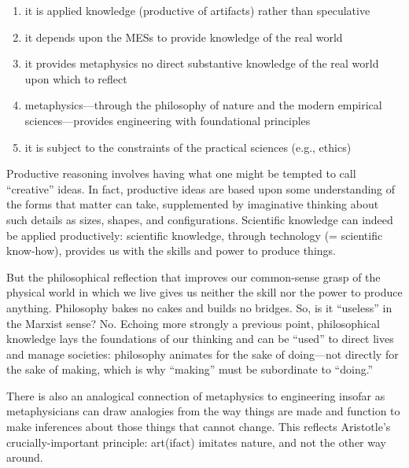 \begin{enumerate}
\item it is applied knowledge (productive of artifacts) rather than speculative
\item it depends upon the MESs to provide knowledge of the real world
\item it provides metaphysics no direct substantive knowledge of the real world upon which to reflect
\item metaphysics---through the philosophy of nature and the modern empirical sciences---provides engineering with foundational principles
\item it is subject to the constraints of the practical sciences (e.g., ethics)
\end{enumerate}

Productive reasoning involves having what one might be tempted to call ``creative'' ideas. In fact, productive ideas are based upon some understanding of the forms that matter can take, supplemented by imaginative thinking about such details as sizes, shapes, and configurations. Scientific knowledge can indeed be applied productively: scientific knowledge, through technology (= scientific know-how), provides us with the skills and power to produce things.

But the philosophical reflection that improves our common-sense grasp of the physical world in which we live gives us neither the skill nor the power to produce anything. Philosophy bakes no cakes and builds no bridges. So, is it ``useless'' in the Marxist sense? No. Echoing more strongly a previous point, philosophical knowledge lays the foundations of our thinking and can be ``used'' to direct lives and manage societies: philosophy animates for the sake of doing---not directly for the sake of making, which is why ``making'' must be subordinate to ``doing.''

There is also an analogical connection of metaphysics to engineering insofar as metaphysicians can draw analogies from the way things are made and function to make inferences about those things that cannot change. This reflects Aristotle’s crucially-important principle: art(ifact) imitates nature, and not the other way around.

